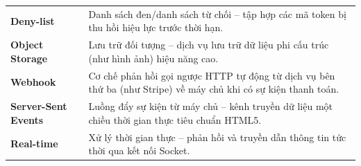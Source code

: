 \documentclass[../DoAn.tex]{subfiles}
\begin{document}
\begin{longtable}{l p{11cm}}
	\textbf{Deny-list} & Danh sách đen/danh sách từ chối – tập hợp các mã token bị thu hồi hiệu lực trước thời hạn.\\
	\textbf{Object Storage} & Lưu trữ đối tượng – dịch vụ lưu trữ dữ liệu phi cấu trúc (như hình ảnh) hiệu năng cao.\\
	\textbf{Webhook} & Cơ chế phản hồi gọi ngược HTTP tự động từ dịch vụ bên thứ ba (như Stripe) về máy chủ khi có sự kiện thanh toán.\\
	\textbf{Server-Sent Events} & Luồng đẩy sự kiện từ máy chủ – kênh truyền dữ liệu một chiều thời gian thực tiêu chuẩn HTML5.\\
	\textbf{Real-time} & Xử lý thời gian thực – phản hồi và truyền dẫn thông tin tức thời qua kết nối Socket.\\
    \hline
\end{longtable}
\end{document}
